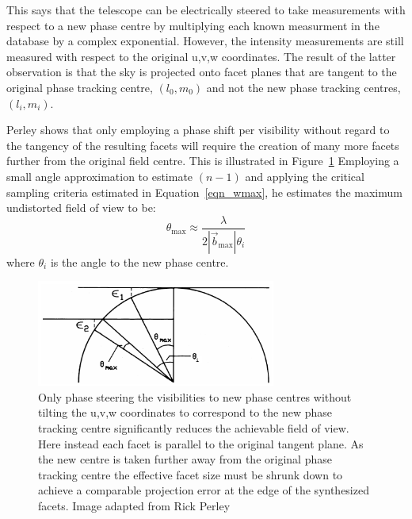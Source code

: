 This says that the telescope can be electrically steered to take measurements with respect to a new phase centre by multiplying each known measurment in
the database by a complex exponential. However, the intensity measurements are still measured with respect to the original u,v,w coordinates. The result of
the latter observation is that the sky is projected onto facet planes that are tangent to the original phase tracking centre, $(l_0,m_0)$ and not the new phase 
tracking centres, $(l_i,m_i)$.

Perley \cite[Lecture 19]{taylor1999synthesis} shows that only employing a phase shift per visibility without regard to the tangency of the resulting facets will require the creation of many more facets 
further from the original field centre. This is illustrated in Figure~\ref{fig_non_rotated_facets} Employing a small angle approximation to estimate $(n-1)$ and applying the critical sampling criteria estimated in 
Equation~\ref{eqn_wmax}, he estimates the maximum undistorted field of view to be:
\begin{equation}
 \theta_{\text{max}} \approx \frac{\lambda}{2|\vec{b}_{\text{max}}|\theta_i}
\end{equation}
where $\theta_i$ is the angle to the new phase centre.

\begin{figure}[h]
  \begin{mdframed}
    \centering
    \includegraphics[width=0.7\textwidth]{images/non_rotated_faceting.png}
    \caption[Faceting without regard of tangency]{Only phase steering the visibilities to new phase centres without tilting the u,v,w coordinates
    to correspond to the new phase tracking centre significantly reduces the achievable field of view. Here instead each facet is parallel to the 
    original tangent plane. As the new centre is taken further away from the original phase tracking centre the effective facet size must be
    shrunk down to achieve a comparable projection error at the edge of the synthesized facets. Image adapted from Rick Perley \cite[Lecture 19]{taylor1999synthesis}}
    \label{fig_non_rotated_facets}
  \end{mdframed}
\end{figure}

